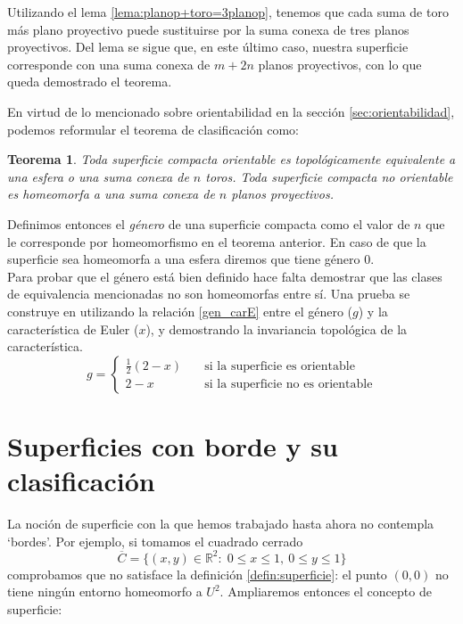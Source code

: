 \documentclass[a4paper,11pt,spanish, twoside, leqno]{tfg-uam}
\newcommand*{\reales}{\mathbb{R}}
\newtheorem*{teorsin}{Teorema}
\theoremstyle{definition}
\begin{document}
Utilizando el lema \ref{lema:planop+toro=3planop}, tenemos que cada suma de toro más plano proyectivo puede sustituirse por la suma conexa de tres planos proyectivos. Del lema se sigue que, en este último caso, nuestra superficie corresponde con una suma conexa de $m+2n$ planos proyectivos, con lo que queda demostrado el teorema.

En virtud de lo mencionado sobre orientabilidad en la sección \ref{sec:orientabilidad}, podemos reformular el teorema de clasificación como:

\begin{teorsin}
Toda superficie compacta orientable es topológicamente equivalente a una esfera o una suma conexa de $n$ toros. Toda superficie compacta no orientable es homeomorfa a una suma conexa de $n$ planos proyectivos.
\end{teorsin}

Definimos entonces el \textit{género} de una superficie compacta como el valor de $n$ que le corresponde por homeomorfismo en el teorema anterior. En caso de que la superficie sea homeomorfa a una esfera diremos que tiene género 0. \\
Para probar que el género está bien definido hace falta demostrar que las clases de equivalencia mencionadas no son homeomorfas entre sí. Una prueba se construye en \cite{massey} utilizando la relación \ref{gen_carE} entre el género ($g$) y la característica de Euler ($x$), y demostrando la invariancia topológica de la característica.
\begin{equation}
\label{gen_carE}
g = \begin{cases}
\frac{1}{2}(2-x) & \quad \text{si la superficie es orientable}\\
2-x & \quad \text{si la superficie no es orientable}
\end{cases}
\end{equation}

\section{Superficies con borde y su clasificación}
\label{sec:superfborde}
La noción de superficie con la que hemos trabajado hasta ahora no contempla `bordes'. Por ejemplo, si tomamos el cuadrado cerrado
\[
\overline{C} = \{(x,y)\in \reales^2:\; 0 \leq x \leq 1, \: 0 \leq y \leq 1  \}
\]
comprobamos que no satisface la definición \ref{defin:superficie}: el punto $(0,0)$ no tiene ningún entorno homeomorfo a $U^2$. Ampliaremos entonces el concepto de superficie:
\end{document}
